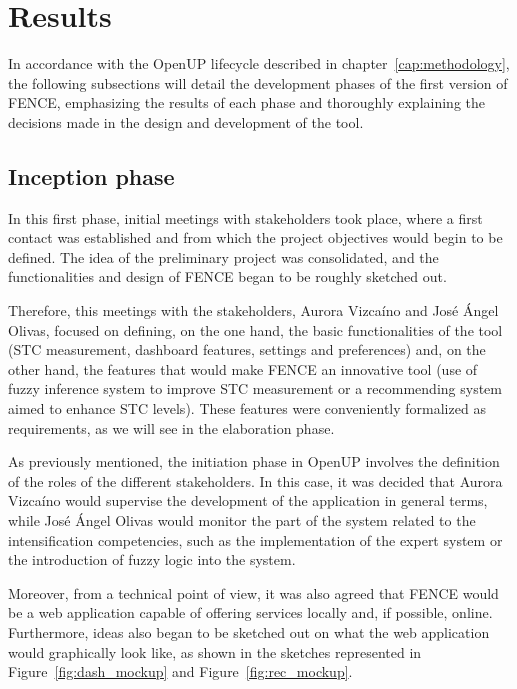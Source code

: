 \chapter{Results}
\label{cap:results}

In accordance with the OpenUP lifecycle described in chapter~\ref{cap:methodology}, the following subsections will detail the development phases of the first version of FENCE, emphasizing the results of each phase and thoroughly explaining the decisions made in the design and development of the tool.

\section{Inception phase}

In this first phase, initial meetings with stakeholders took place, where a first contact was established and from which the project objectives would begin to be defined. The idea of the preliminary project was consolidated, and the functionalities and design of FENCE began to be roughly sketched out.

Therefore, this meetings with the stakeholders, Aurora Vizcaíno and José Ángel Olivas, focused on defining, on the one hand, the basic functionalities of the tool (STC measurement, dashboard features, settings and preferences) and, on the other hand, the features that would make FENCE an innovative tool (use of fuzzy inference system to improve STC measurement or a recommending system aimed to enhance STC levels). These features were conveniently formalized as requirements, as we will see in the elaboration phase.

As previously mentioned, the initiation phase in OpenUP involves the definition of the roles of the different stakeholders. In this case, it was decided that Aurora Vizcaíno would supervise the development of the application in general terms, while José Ángel Olivas would monitor the part of the system related to the intensification competencies, such as the implementation of the expert system or the introduction of fuzzy logic into the system.

Moreover, from a technical point of view, it was also agreed that FENCE would be a web application capable of offering services locally and, if possible, online. Furthermore, ideas also began to be sketched out on what the web application would graphically look like, as shown in the sketches represented in Figure~\ref{fig:dash_mockup} and Figure~\ref{fig:rec_mockup}.

